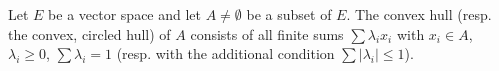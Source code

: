 Let $E$ be a vector space and let $A \neq \emptyset$ be a subset of $E$. The convex hull (resp. the convex, circled hull) of $A$ consists of all finite sums $\sum \lambda_i x_i$ with $x_i \in A$, $\lambda_i \geq 0$, $\sum \lambda_i = 1$ (resp. with the additional condition $\sum |\lambda_i| \leq 1$).
